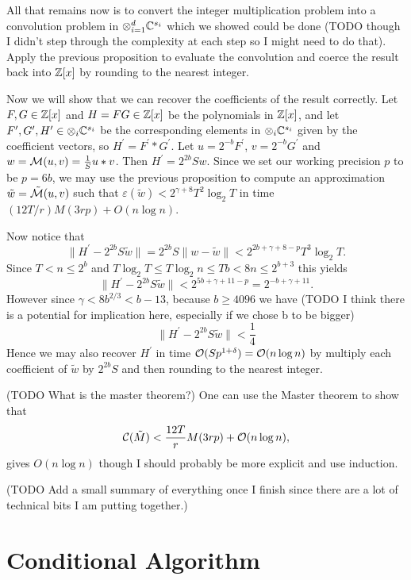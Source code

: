 
All that remains now is to convert the integer multiplication problem into a convolution problem in $\otimes_{i=1}^d {\mathbb C}^{s_i}$ which we showed could be done (TODO though I didn't step through the complexity at each step so I might need to do that). Apply the previous proposition to evaluate the convolution and coerce the result back into ${\mathbb Z}[x]$ by rounding to the nearest integer.

Now we will show that we can recover the coefficients of the result correctly.
Let $F, G \in {\mathbb Z}[x]$ and $H = FG \in {\mathbb Z}[x]$ be the polynomials in ${\mathbb Z}[x]$, and let $F^\prime, G^\prime, H^\prime \in \otimes_i {\mathbb C}^{s_i}$ be the corresponding elements in $\otimes_i {\mathbb C}^{s_i}$ given by the coefficient vectors, so $H^\prime = F^\prime \ast G^\prime$. Let $u = 2^{-b}F^\prime$, $v = 2^{-b} G^\prime$ and $w = \mathcal M(u, v) = \frac{1}{S} u \ast v$. Then $H^\prime = 2^{2b}Sw$. Since we set our working precision $p$ to be $p = 6b$, we may use the previous proposition to compute an approximation $\tilde{w} = \tilde{\mathcal M}(u, v)$ such that $\varepsilon(\tilde{w}) < 2^{\gamma + 8} T^2 \log_2 T$ in time $(12T/r)M(3rp) + O(n \log n)$.

Now notice that
\[
    \|H^\prime - 2^{2b}S\tilde{w}\| = 2^{2b}S\|w - \tilde{w}\| < 2^{2b + \gamma + 8 - p} T^3 \log_2 T.
\]
Since $T < n \le 2^b$ and $T \log _2 T \le T \log_2 n \le Tb < 8n \le 2^{b+3}$ this yields
\[
    \|H^\prime - 2^{2b}S\tilde{w}\| < 2^{5b + \gamma + 11 - p} = 2^{-b + \gamma + 11}.
\]
However since $\gamma < 8b^{2/3} < b - 13$, because $b \ge 4096$ we have (TODO I think there is a potential for implication here, especially if we chose b to be bigger)
\[
    \| H^\prime - 2^{2b}S \tilde{w} \| < \frac{1}{4}
\]
Hence we may also recover $H^\prime$ in time $\mathcal O(Sp^{1 + \delta}) = \mathcal O(n \log n)$ by multiply each coefficient of $\tilde{w}$ by $2^{2b}S$ and then rounding to the nearest integer.

(TODO What is the master theorem?)
One can use the Master theorem to show that
    \[
        \mathcal C(\tilde{M}) < \frac{12T}{r} M(3rp) + \mathcal O(n \log n),
    \]
gives $O(n \log n)$ though I should probably be more explicit and use induction.

(TODO Add a small summary of everything once I finish since there are a lot of technical bits I am putting together.)

\newpage

\section{Conditional Algorithm}

